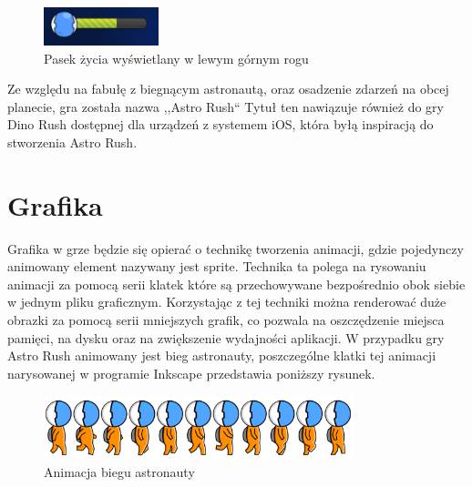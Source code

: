 \begin{figure}[h]
    \centering
    \includegraphics[height=42px]{./Pictures/livebar.png}
    \caption{Pasek życia wyświetlany w lewym górnym rogu}
\end{figure}

Ze względu na fabułę z biegnącym astronautą, oraz osadzenie zdarzeń na obcej planecie, gra została nazwa ,,Astro Rush`` Tytuł ten nawiązuje również do gry Dino Rush dostępnej dla urządzeń z systemem iOS, która byłą inspiracją do stworzenia Astro Rush.

\section{Grafika}

\hspace{1cm} Grafika w grze będzie się opierać o technikę tworzenia animacji, gdzie pojedynczy animowany element nazywany jest sprite. Technika ta polega na rysowaniu animacji za pomocą serii klatek które są przechowywane bezpośrednio obok siebie w jednym pliku graficznym. Korzystając z tej techniki można renderować duże obrazki za pomocą serii mniejszych grafik, co pozwala na oszczędzenie miejsca  pamięci, na dysku oraz na zwiększenie wydajności aplikacji. W przypadku gry Astro Rush animowany jest bieg astronauty, poszczególne klatki tej animacji narysowanej w programie Inkscape przedstawia poniższy rysunek.

\begin{figure}[h]
    \centering
    \includegraphics[width=0.8\textwidth,natwidth=410,natheight=142]{./Pictures/astroRun.jpg}
    \caption{Animacja biegu astronauty}
\end{figure}

